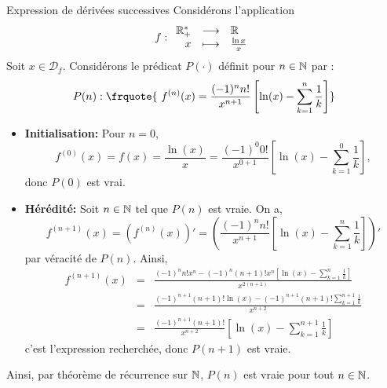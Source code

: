 \documentclass{article}
\renewenvironment{question_kholle}[2][ ]
{
	\subsection{\texorpdfstring{#2}{}}
	\notblank{#1}
	{
		\noindent #1
		\bigbreak
	}
	{}
	\begin{proof}
}
{
	\end{proof}
}
\begin{document}
\begin{question_kholle}
	{Expression de dérivées successives}
	Considérons l’application
	\[
		f:\begin{array}{rcl}
			\mathbb R_+^* & \longrightarrow & \mathbb R              \\
			x      & \longmapsto     & \frac{\ln x}{x}
		\end{array}\]
	Soit $x\in \mathcal{D}_f$.
	Considérons le prédicat $P(\cdot)$ définit pour $n\in \mathbb N$ par :
	$$ P(n): \frquote{\ f^{(n)}(x) = \frac{(-1)^n n!}{x^{n+1}}\left[ \ln (x) - \sum_{k=1}^n \frac{1}{k} \right]}$$
	\begin{itemize}[label=$\star$]
		\item \textbf{Initialisation: }
		      Pour $n = 0$, $$f^{(0)}(x) = f(x) = \frac{\ln (x)}{x} = \frac{(-1)^0 0!}{x^{0+1}}\left[ \ln (x) - \sum_{k=1}^0 \frac{1}{k} \right],$$ donc $P(0)$ est vrai.
		\item \textbf{Hérédité: }
		      Soit $n\in \mathbb N$ tel que $P(n)$ est vraie. On a,
		      $$f^{(n+1)}(x) = (f^{(n)}(x))' = \left( \frac{(-1)^n n!}{x^{n+1}}\left[ \ln (x) - \sum_{k=1}^n \frac{1}{k} \right] \right)'$$
		      par véracité de $P(n)$. Ainsi,
		      $$\begin{array}{rcl}
				      f^{(n+1)}(x) & = & \frac{(-1)^nn!x^n - (-1)^n(n+1)!x^n\left[ \ln (x) - \sum_{k=1}^n \frac{1}{k} \right]}{x^{2(n+1)}} \\ [1ex]
				                   & = & \frac{(-1)^{n+1}(n+1)!\ln (x) - (-1)^{n+1}(n+1)!\sum_{k=1}^{n+1} \frac{1}{k} }{x^{n+2}}           \\ [1ex]
				                   & = & \frac{(-1)^{n+1} (n+1)!}{x^{n+2}}\left[ \ln (x) - \sum_{k=1}^{n+1} \frac{1}{k} \right]
			      \end{array}$$
		      c'est l'expression recherchée, donc $P(n+1)$ est vraie.
	\end{itemize}
	Ainsi, par théorème de récurrence sur $\mathbb N$, $P(n)$ est vraie pour tout $n\in \mathbb N$.
\end{question_kholle}
\end{document}
